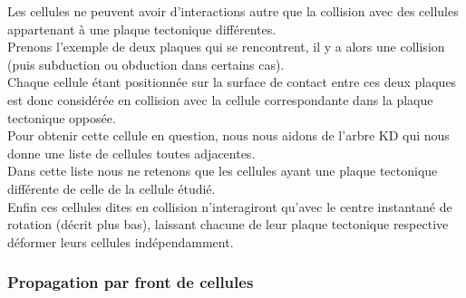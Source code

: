 \documentclass[a4paper,11pt]{article}
\begin{document}
Les cellules ne peuvent avoir d'interactions autre que la collision avec des cellules appartenant à une plaque tectonique différentes.\\
Prenons l'exemple de deux plaques qui se rencontrent, il y a alors une collision (puis subduction ou obduction dans certains cas).\\
Chaque cellule étant positionnée sur la surface de contact entre ces deux plaques est donc considérée en collision avec la cellule correspondante dans la plaque tectonique opposée.\\
Pour obtenir cette cellule en question, nous nous aidons de l'arbre KD qui nous donne une liste de cellules toutes adjacentes.\\
Dans cette liste nous ne retenons que les cellules ayant une plaque tectonique différente de celle de la cellule étudié.\\
Enfin ces cellules dites en collision n'interagiront qu'avec le centre instantané de rotation (décrit plus bas), laissant chacune de leur plaque tectonique respective déformer leurs cellules indépendamment.

\subsubsection{Propagation par front de cellules}
\end{document}
